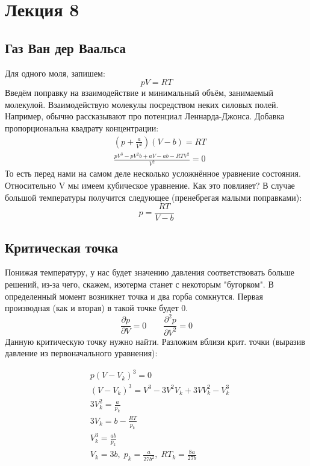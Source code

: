 \documentclass[a4paper, 12pt]{article}
\begin{document}
	\section{Лекция 8}
	\subsection{Газ Ван дер Ваальса}
	Для одного моля, запишем:
	\begin{equation*}
		pV=RT
	\end{equation*}
	Введём поправку на взаимодействие и минимальный объём, занимаемый молекулой. Взаимодействую молекулы посредством неких силовых полей. Например, обычно рассказывают про потенциал Леннарда-Джонса. Добавка пропорциональна квадрату концентрации:
	\begin{equation*}
		\begin{aligned}
			& (p+\frac{a}{V^{2}})(V-b) = RT                       \\
			& \frac{pV^{3}-pV^{2}b + aV - ab -RTV^{2}}{V^{2}} = 0 
		\end{aligned}
	\end{equation*}
	То есть перед нами на самом деле несколько усложнённое уравнение состояния. Относительно V мы имеем кубическое уравнение. Как это повлияет? В случае большой температуры получится следующее (пренебрегая малыми поправками):
	\begin{equation*}
		p = \frac{RT}{V-b}
	\end{equation*}
	\subsection{Критическая точка}
	Понижая температуру, у нас будет значению давления соответствовать больше решений, из-за чего, скажем, изотерма станет с некоторым "бугорком". В определенный момент возникнет точка и два горба сомкнутся. Первая производная (как и вторая) в такой точке будет 0. 
	\begin{equation*}
		\frac{\partial p}{\partial V} = 0 \qquad \frac{\partial^{2} p}{\partial V^{2}} = 0
	\end{equation*}
	Данную критическую точку нужно найти. Разложим вблизи крит. точки (выразив давление из первоначального уравнения):
	
	\begin{equation*}
		\begin{aligned}
			& p(V-V_{k})^3=0                                                       \\
			& (V-V_{k})^{3} = V^{3} - 3V^{2}V_{k} +3VV_{k}^{2} - V_{k}^{3}         \\
			& 3V_{k}^{2} = \frac{a}{p_{k}}                                         \\
			& 3V_{k} = b - \frac{RT}{p_{k}}                                        \\
			& V_{k}^{3} = \frac{ab}{p_{k}}                                         \\
			& V_{k} = 3b, \; p_{k} = \frac{a}{27b^{2}}, \; RT_{k} = \frac{8a}{27b} 
		\end{aligned}
	\end{equation*}
	
\end{document}
